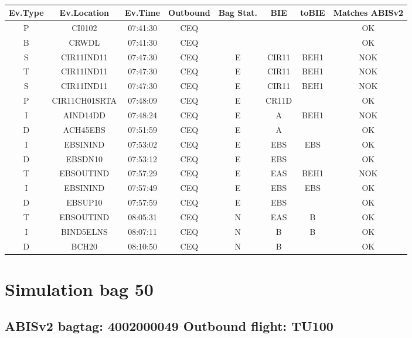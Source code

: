 \documentclass{report}
\begin{document}
\paragraph{}
\begin{longtable}{cccccccc}    \toprule
\rowcolor{white!50}
\textbf{Ev.Type} & \textbf{Ev.Location} & \textbf{Ev.Time} & \textbf{Outbound} & \textbf{Bag Stat.} & \textbf{BIE} & \textbf{toBIE} & \textbf{Matches ABISv2} \\\midrule
P & CI0102 & 07:41:30  & CEQ &  &  &  & OK\\
B & CRWDL & 07:41:30  & CEQ &  &  &  & OK\\
S & CIR11IND11 & 07:47:30  & CEQ & E & CIR11 & BEH1 & NOK\\
T & CIR11IND11 & 07:47:30  & CEQ & E & CIR11 & BEH1 & NOK\\
S & CIR11IND11 & 07:47:30  & CEQ & E & CIR11 & BEH1 & NOK\\
P & CIR11CH01SRTA & 07:48:09  & CEQ & E & CR11D &  & OK\\
I & AIND14DD & 07:48:24  & CEQ & E & A & BEH1 & NOK\\
D & ACH45EBS & 07:51:59  & CEQ & E & A &  & OK\\
I & EBSININD & 07:53:02  & CEQ & E & EBS & EBS & OK\\
D & EBSDN10 & 07:53:12  & CEQ & E & EBS &  & OK\\
T & EBSOUTIND & 07:57:29  & CEQ & E & EAS & BEH1 & NOK\\
I & EBSININD & 07:57:49  & CEQ & E & EBS & EBS & OK\\
D & EBSUP10 & 07:57:59  & CEQ & E & EBS &  & OK\\
T & EBSOUTIND & 08:05:31  & CEQ & N & EAS & B & OK\\
I & BIND5ELNS & 08:07:11  & CEQ & N & B & B & OK\\
D & BCH20 & 08:10:50  & CEQ & N & B &  & OK\\
\bottomrule
\end{longtable}
\pagebreak
\section*{Simulation bag 50}
\subsection*{ABISv2 bagtag: 4002000049 Outbound flight: TU100}
\end{document}
